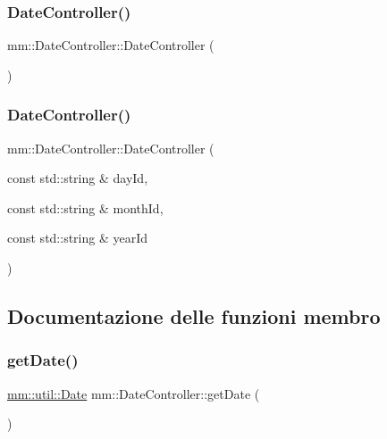 \subsubsection{\texorpdfstring{Date\+Controller()}{DateController()}\hspace{0.1cm}{\footnotesize\ttfamily [1/2]}}
{\footnotesize\ttfamily mm\+::\+Date\+Controller\+::\+Date\+Controller (\begin{DoxyParamCaption}{ }\end{DoxyParamCaption})\hspace{0.3cm}{\ttfamily [delete]}}

\mbox{\label{structmm_1_1_date_controller_a591167277348214a72634a4bbc9272ad}} 
\subsubsection{\texorpdfstring{Date\+Controller()}{DateController()}\hspace{0.1cm}{\footnotesize\ttfamily [2/2]}}
{\footnotesize\ttfamily mm\+::\+Date\+Controller\+::\+Date\+Controller (\begin{DoxyParamCaption}\item[{const std\+::string \&}]{day\+Id,  }\item[{const std\+::string \&}]{month\+Id,  }\item[{const std\+::string \&}]{year\+Id }\end{DoxyParamCaption})}



\subsection{Documentazione delle funzioni membro}
\mbox{\label{structmm_1_1_date_controller_aa3c0122bfcc36e8d8b43c8ca7ca76197}} 
\subsubsection{\texorpdfstring{get\+Date()}{getDate()}}
{\footnotesize\ttfamily \mbox{\hyperlink{structmm_1_1util_1_1_date}{mm\+::util\+::\+Date}} mm\+::\+Date\+Controller\+::get\+Date (\begin{DoxyParamCaption}{ }\end{DoxyParamCaption})}

